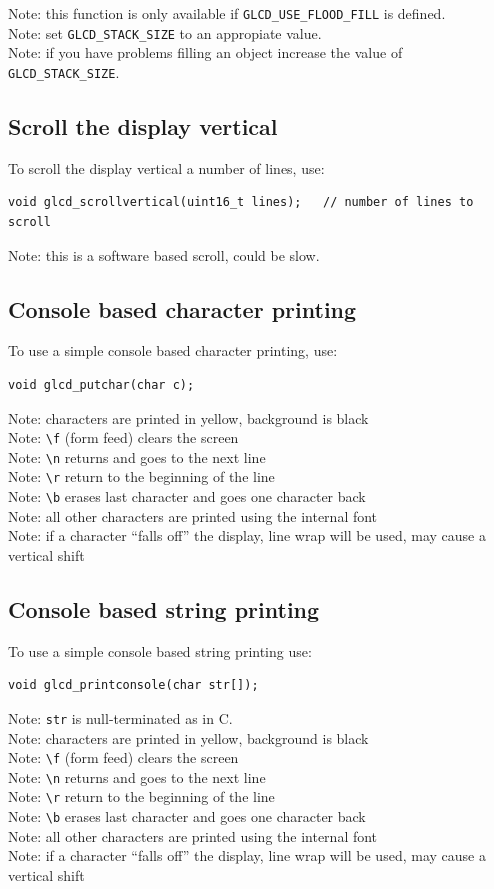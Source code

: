 \documentclass[12pt]{article}
\begin{document}
Note: this function is only available if \lstinline|GLCD_USE_FLOOD_FILL| is defined.\\
Note: set \lstinline|GLCD_STACK_SIZE| to an appropiate value.\\
Note: if you have problems filling an object increase the value of \lstinline|GLCD_STACK_SIZE|.

\subsection{Scroll the display vertical}
To scroll the display vertical a number of lines, use:
\begin{lstlisting}
void glcd_scrollvertical(uint16_t lines);   // number of lines to scroll
\end{lstlisting}

Note: this is a software based scroll, could be slow.

\subsection{Console based character printing}
To use a simple console based character printing, use:
\begin{lstlisting}
void glcd_putchar(char c);
\end{lstlisting}

Note: characters are printed in yellow, background is black\\
Note: \lstinline|\f| (form feed) clears the screen\\
Note: \lstinline|\n| returns and goes to the next line\\
Note: \lstinline|\r| return to the beginning of the line\\
Note: \lstinline|\b| erases last character and goes one character back\\
Note: all other characters are printed using the internal font\\
Note: if a character ``falls off'' the display, line wrap will be used, may cause a vertical shift

\subsection{Console based string printing}
To use a simple console based string printing use:
\begin{lstlisting}
void glcd_printconsole(char str[]);
\end{lstlisting}

Note: \lstinline|str| is null-terminated as in C.\\
Note: characters are printed in yellow, background is black\\
Note: \lstinline|\f| (form feed) clears the screen\\
Note: \lstinline|\n| returns and goes to the next line\\
Note: \lstinline|\r| return to the beginning of the line\\
Note: \lstinline|\b| erases last character and goes one character back\\
Note: all other characters are printed using the internal font\\
Note: if a character ``falls off'' the display, line wrap will be used, may cause a vertical shift
\end{document}
